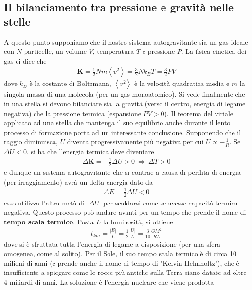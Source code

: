 \documentclass[a4paper, oneside]{book}
\begin{document}
\subsection{Il bilanciamento tra pressione e gravità nelle stelle}
A questo punto supponiamo che il nostro sistema autogravitante sia un gas ideale con $N$ particelle, 
un volume $V$, temperatura $T$ e pressione $P$. La fisica cinetica dei gas ci dice che 
\begin{gather*}
    \mathbf{K} = \frac{1}{2}Nm\left< v^{2} \right>  = \frac{3}{2}Nk_B T = \frac{3}{2}PV
\end{gather*}
dove $k_B$ è la costante di Boltzmann, $\left< v^{2} \right> $ è la velocità quadratica media e $m$ la singola
massa di una molecola (per un gas monoatomico). Si vede finalmente che in una stella 
si devono bilanciare sia la gravità (verso il centro, energia di legame negativa) 
che la pressione termica (espansione $PV > 0$). 
Il teorema del viriale applicato ad una stella che mantenga il suo equilibrio anche durante il lento processo 
di formazione porta ad un interessante conclusione. Supponendo che il raggio diminuisca, 
$U$ diventa progressivamente più negativa per cui $U \propto - \frac{1}{R}$. Se 
$\Delta U < 0$, si ha che l'energia termica deve diventare
\begin{align}
    \Delta \mathbf{K} = -\frac{1}{2}\Delta U > 0 \ \Longrightarrow \ \Delta T > 0
\end{align}
e dunque un sistema autogravitante che si contrae a causa di perdita di energia (per irraggiamento) avrà un 
delta energia dato da
\begin{gather*}
    \Delta E = \frac{1}{2}\Delta U < 0
\end{gather*}
esso utilizza l'altra metà di $\left| \Delta U \right|$ per scaldarsi come se avesse capacità 
termica negativa. Questo processo può andare avanti per un tempo che prende il nome
di \textbf{tempo scala termico}. Posta $L$ la luminosità, si ottiene 
\begin{align}
    t_{km} = \frac{\left| E \right| }{L} = \frac{1}{2} \frac{\left| U \right| }{L} = \frac{3}{10} \frac{GM^{2}}{RL}
\end{align} 
dove si è sfruttata tutta l'energia di legame a disposizione (per una sfera omogenea, come al solito). 
Per il Sole, il suo tempo scala termico è di circa 10 milioni di anni (e prende anche 
il nome di tempo di "Kelvin-Helmholtz"), che è insufficiente a spiegare come le rocce più antiche 
sulla Terra siano datate ad oltre 4 miliardi di anni. La soluzione è l'energia nucleare che viene prodotta
\end{document}

